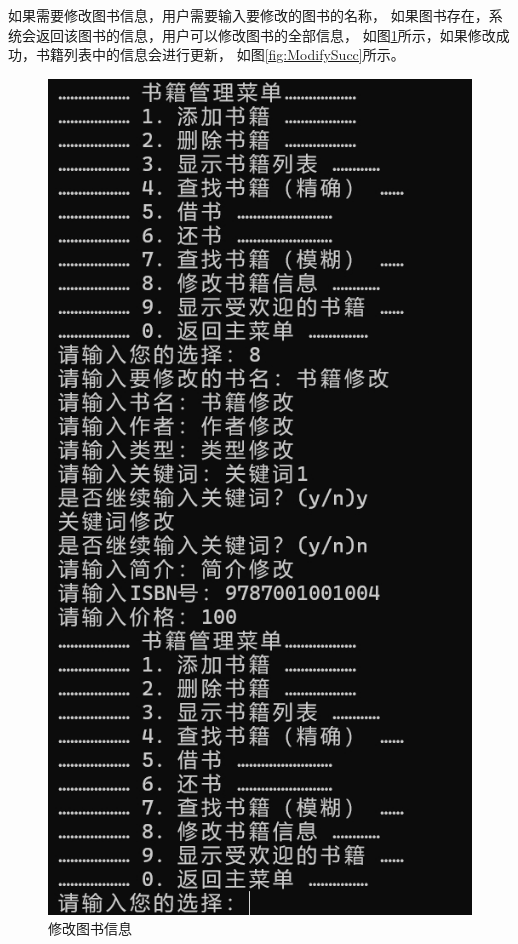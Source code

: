 \documentclass[12pt,twoside]{ctexart}
\begin{document}
如果需要修改图书信息，用户需要输入要修改的图书的名称，
如果图书存在，系统会返回该图书的信息，用户可以修改图书的全部信息，
如图\ref{fig:ModifyBook}所示，如果修改成功，书籍列表中的信息会进行更新，
如图\ref{fig:ModifySucc}所示。


\begin{figure}[H]
    \centering
    \begin{minipage}{0.48\textwidth}
        \centering
        \includegraphics[width=0.8\linewidth]{Book/modifybook.png}
        \caption{修改图书信息}
        \label{fig:ModifyBook}
    \end{minipage}
    \hfill
    \begin{minipage}{0.48\textwidth}
        \centering

\end{minipage}
\end{figure}
\end{document}
